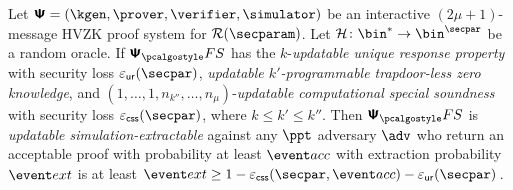 
\begin{theorem}
	\label{thm:se}
	Let $\ps = (\kgen, \prover, \verifier, \simulator)$ be an interactive
	$(2 \mu + 1)$-message HVZK proof system for $\RELGEN(\secparam)$. Let
	$\ro \colon \bin^{*} \to \bin^{\secpar}$ be a random oracle. If $\psfs$ has the
	$k$-\emph{updatable unique response property} with security loss $\epsur(\secpar)$, 
	\emph{updatable $k'$-programmable trapdoor-less zero knowledge}, and $(1, \ldots, 1, n_{k''}, \ldots, n_\mu)$-\emph{updatable computational special soundness} with security loss $\epscss(\secpar)$, where $k \leq k' \leq k''$. Then $\psfs$ is \emph{updatable simulation-extractable} against any $\ppt$ adversary $\advse$ who return an acceptable proof with probability at least $\accProb$ with 	extraction probability $\extProb$ is at least
	$\extProb \geq 1 - \epscss(\secpar, \accProb) - \epsur(\secpar)\,$.
\end{theorem}

